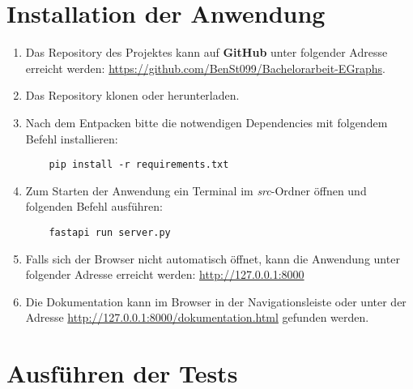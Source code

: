 \section{Installation der Anwendung}\label{sec:installation}

\begin{enumerate}
  \item Das Repository des Projektes kann auf \textbf{GitHub} unter folgender Adresse erreicht werden: \url{https://github.com/BenSt099/Bachelorarbeit-EGraphs}.
  \item Das Repository klonen oder herunterladen.
  \item Nach dem Entpacken bitte die notwendigen Dependencies mit folgendem Befehl installieren:
  
  \begin{verbatim}
    pip install -r requirements.txt
  \end{verbatim}

  \item Zum Starten der Anwendung ein Terminal im \textit{src}-Ordner öffnen und folgenden Befehl ausführen:

  \begin{verbatim}
    fastapi run server.py
  \end{verbatim}
  
  \item Falls sich der Browser nicht automatisch öffnet, kann die Anwendung unter folgender Adresse erreicht werden:
  \url{http://127.0.0.1:8000}
  \item Die Dokumentation kann im Browser in der Navigationsleiste oder unter der Adresse \url{http://127.0.0.1:8000/dokumentation.html} gefunden werden.
\end{enumerate}

\section{Ausführen der Tests}

